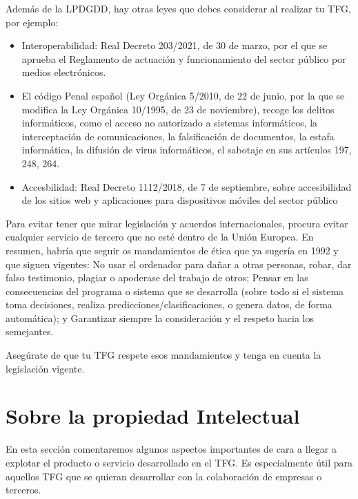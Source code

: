 {Además de la LPDGDD, hay otras leyes que debes considerar al realizar tu TFG, por ejemplo:
 
\begin{itemize}
    \item Interoperabilidad: Real Decreto 203/2021, de 30 de marzo, por el que se aprueba el Reglamento de actuación y funcionamiento del sector público por medios electrónicos.
    \item El código Penal español (Ley Orgánica 5/2010, de 22 de junio, por la que se modifica la Ley Orgánica 10/1995, de 23 de noviembre), recoge los delitos informáticos, como el acceso no autorizado a sistemas informáticos, la interceptación de comunicaciones, la falsificación de documentos, la estafa informática, la difusión de virus informáticos, el sabotaje en sus artículos 197, 248, 264.
    \item Accesbilidad: Real Decreto 1112/2018, de 7 de septiembre, sobre accesibilidad de los sitios web y aplicaciones para dispositivos móviles del sector público
\end{itemize}

Para evitar tener que mirar legislación y acuerdos internacionales, procura evitar cualquier servicio de tercero que no esté dentro de la Unión Europea.
En resumen, habría que seguir os mandamientos de ética que ya sugería \cite{EticaUCM} en 1992 y que siguen vigentes: No usar el ordenador para dañar a otras personas, robar, dar falso testimonio, plagiar o apoderase del trabajo de otros; Pensar en las consecuencias del programa o sistema que se desarrolla (sobre todo si el sistema toma decisiones, realiza predicciones/clasificaciones, o genera datos, de forma automática); y Garantizar siempre la consideración y el respeto hacia los semejantes.

Asegúrate de que tu TFG respete esos mandamientos y tenga en cuenta la legislación vigente.

\section{Sobre la propiedad Intelectual} %

En esta sección comentaremos algunos aspectos importantes de cara a llegar a explotar el producto o servicio desarrollado en el TFG. Es especialmente útil para aquellos TFG que se quieran desarrollar con la colaboración de empresas o terceros.

}
